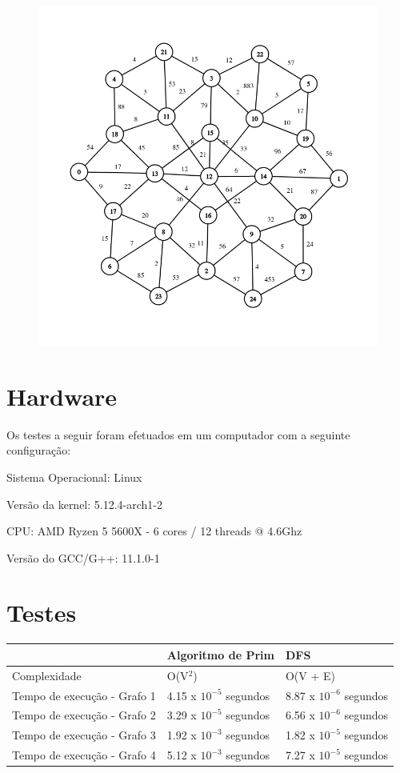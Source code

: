 \documentclass[12pt]{article}
\begin{document}
\begin{figure}[ht]
    \centering
    \includegraphics[scale=0.6]{grafo4.png}
\end{figure}

\newpage

\section*{Hardware}
Os testes a seguir foram efetuados em um computador com a seguinte configuração:


Sistema Operacional: Linux


Versão da kernel: 5.12.4-arch1-2


CPU: AMD Ryzen 5 5600X - 6 cores / 12 threads @ 4.6Ghz


Versão do GCC/G++: 11.1.0-1


\section*{Testes}


\begin{table}
    \begin{tabular}{lll}
    ~                           & Algoritmo de Prim          & DFS                      \\ \hline
    Complexidade                & O(V$^2$)                   & O(V + E)                 \\
    Tempo de execução - Grafo 1 & 4.15 x $10^{-5}$ segundos  & 8.87 x $10^{-6}$ segundos\\
    Tempo de execução - Grafo 2 & 3.29 x $10^{-5}$ segundos  & 6.56 x $10^{-6}$ segundos\\
    Tempo de execução - Grafo 3 & 1.92 x $10^{-3}$ segundos  & 1.82 x $10^{-5}$ segundos\\
    Tempo de execução - Grafo 4 & 5.12 x $10^{-3}$ segundos  & 7.27 x $10^{-5}$ segundos\\ 
    \end{tabular}
\end{table}
\end{document}
